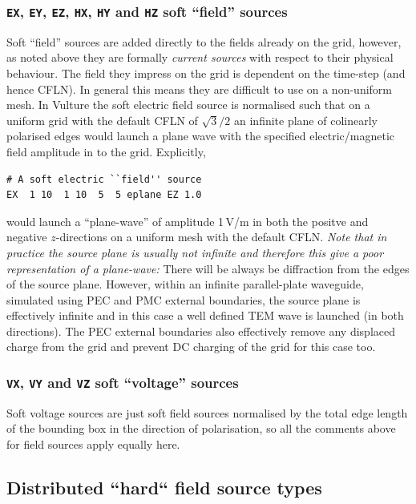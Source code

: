 \documentclass[onecolumn,a4paper]{article}
\numberwithin{equation}{section}
\begin{document}
\subsubsection{\texttt{EX}, \texttt{EY}, \texttt{EZ}, \texttt{HX}, \texttt{HY} and \texttt{HZ} soft ``field'' sources}

Soft ``field'' sources are added directly to the fields already on the grid, however, as noted above they
are formally {\em current sources} with respect to their physical behaviour. The field they impress on the grid
is dependent on the time-step (and hence CFLN). In general this means they are difficult to use on a
non-uniform mesh. In Vulture the soft electric field source is normalised such that on a uniform grid with the
default CFLN of $\sqrt{3}/2$ an infinite plane of colinearly polarised edges would launch a plane 
wave with the specified electric/magnetic field amplitude in to the grid. Explicitly,
\begin{verbatim}
# A soft electric ``field'' source
EX  1 10  1 10  5  5 eplane EZ 1.0
\end{verbatim}
would launch a ``plane-wave'' of amplitude 1\,V/m in both the positve and negative $z$-directions
on a uniform mesh with the default CFLN. {\em Note that in practice the source plane is usually not infinite 
and therefore this give a poor representation of a plane-wave:} There will be always be diffraction 
from the edges of the source plane. However, within an infinite parallel-plate waveguide, simulated using
PEC and PMC external boundaries, the source plane is effectively infinite and in this case a well defined
TEM wave is launched (in both directions). The PEC external boundaries also effectively remove any displaced charge from the
grid and prevent DC charging of the grid for this case too.

\subsubsection{\texttt{VX}, \texttt{VY} and \texttt{VZ} soft ``voltage'' sources}

Soft voltage sources are just soft field sources normalised by the total edge length of 
the bounding box in the direction of polarisation, so all the comments above for field sources 
apply equally here.

\subsection{Distributed ``hard`` field source types}
\end{document}
